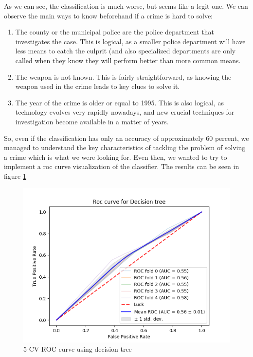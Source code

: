 \documentclass[12pt]{report}
\begin{document}
As we can see, the classification is much worse, but seems like a legit one. We can observe the main ways to know beforehand if a crime is hard to solve:
\begin{enumerate}
\item The county or the municipal police are the police department that investigates the case. This is logical, as a smaller police department will have less means to catch the culprit (and also specialized departments are only called when they know they will perform better than more common means.
\item The weapon is not known. This is fairly straightforward, as knowing the weapon used in the crime leads to key clues to solve it.
\item The year of the crime is older or equal to 1995. This is also logical, as technology evolves very rapidly nowadays, and new crucial techniques for investigation become available in a matter of years.
\end{enumerate}

So, even if the classification has only an accuracy of approximately 60 percent, we managed to understand the key characteristics of tackling the problem of solving a crime which is what we were looking for. Even then, we wanted to try to implement a roc curve visualization of the classifier. The results can be seen in figure \ref{fig:ROCDT}

\begin{figure}[h]
  \centering
  \includegraphics[width=\linewidth]{../Images/RocCurveDecisionTree}
  \caption{5-CV ROC curve using decision tree}
  \label{fig:ROCDT}
\end{figure}
\end{document}
